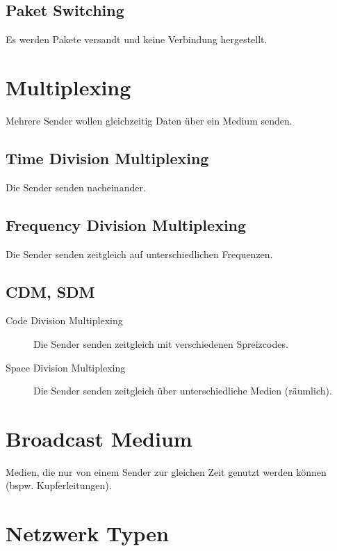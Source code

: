 \documentclass[a4paper, 11pt, accentcolor = tud3b]{tudreport}
\begin{document}
            \subsection{Paket Switching}
                Es werden Pakete versandt und keine Verbindung hergestellt.

        \section{Multiplexing}
            Mehrere Sender wollen gleichzeitig Daten über ein Medium senden.

            \subsection{Time Division Multiplexing}
                Die Sender senden nacheinander.

            \subsection{Frequency Division Multiplexing}
                Die Sender senden zeitgleich auf unterschiedlichen Frequenzen.

            \subsection{CDM, SDM}
                \begin{description}
                	\item[Code Division Multiplexing] Die Sender senden zeitgleich mit verschiedenen Spreizcodes.
                	\item[Space Division Multiplexing] Die Sender senden zeitgleich über unterschiedliche Medien (räumlich).
                \end{description}

        \section{Broadcast Medium}
            Medien, die nur von einem Sender zur gleichen Zeit genutzt werden können (bspw. Kupferleitungen).

        \section{Netzwerk Typen}
\end{document}

